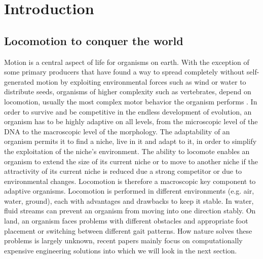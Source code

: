 \documentclass[main]{subfiles}
\begin{document}
\setcounter{chapter}{0}

\chapter{Introduction} %

\label{Chapter\thechapter} %


\section{Locomotion to conquer the world}

Motion is a central aspect of life for organisms on earth. %
%
With the exception of some primary producers that have found a way to spread completely without self-generated motion by exploiting environmental forces such as wind or water to distribute seeds, organisms of higher complexity such as vertebrates, depend on locomotion, usually the most complex motor behavior the organism performs \cite{bib:Grillner2000}. %
%
In order to survive and be competitive in the endless development of evolution, an organism has to be highly adaptive on all levels, from the microscopic level of the DNA to the macroscopic level of the morphology. %
%
The adaptability of an organism permits it to find a niche, live in it and adapt to it, in order to simplify the exploitation of the niche's environment. %
%
The ability to locomote enables an organism to extend the size of its current niche or to move to another niche if the attractivity of its current niche is reduced due a strong competitor or due to environmental changes. Locomotion is therefore a macroscopic key component to adaptive organisms. %
%
Locomotion is performed in different environments (e.g. air, water, ground), each with advantages and drawbacks to keep it stable. %
%
In water, fluid streams can prevent an organism from moving into one direction stably. %
%
On land, an organism faces problems with different obstacles and appropriate foot placement or switching between different gait patterns. %
%
How nature solves these problems is largely unknown, recent papers mainly focus on computationally expensive engineering solutions into which we will look in the next section.
\end{document}
